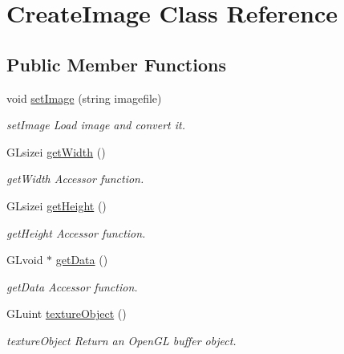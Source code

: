 \hypertarget{classCreateImage}{}\section{Create\+Image Class Reference}
\label{classCreateImage}
\subsection*{Public Member Functions}
\begin{DoxyCompactItemize}
\item 
void \hyperlink{classCreateImage_a0fb8715c56dc5ff120aa355ca66496f6}{set\+Image} (string imagefile)
\begin{DoxyCompactList}\small\item\em set\+Image Load image and convert it. \end{DoxyCompactList}\item 
G\+Lsizei \hyperlink{classCreateImage_ac0edbffce968346bd4c43564beb27c26}{get\+Width} ()
\begin{DoxyCompactList}\small\item\em get\+Width Accessor function. \end{DoxyCompactList}\item 
\mbox{\label{classCreateImage_abeb628a5f2fc67aeb1c39c1d0a445142}} 
G\+Lsizei \hyperlink{classCreateImage_abeb628a5f2fc67aeb1c39c1d0a445142}{get\+Height} ()
\begin{DoxyCompactList}\small\item\em get\+Height Accessor function. \end{DoxyCompactList}\item 
\mbox{\label{classCreateImage_a85dfaf7a1b8bf86c12877b117f8989b8}} 
G\+Lvoid $\ast$ \hyperlink{classCreateImage_a85dfaf7a1b8bf86c12877b117f8989b8}{get\+Data} ()
\begin{DoxyCompactList}\small\item\em get\+Data Accessor function. \end{DoxyCompactList}\item 
G\+Luint \hyperlink{classCreateImage_a529a1307050df8719e180e006141b762}{texture\+Object} ()
\begin{DoxyCompactList}\small\item\em texture\+Object Return an Open\+GL buffer object. \end{DoxyCompactList}\item 

\end{DoxyCompactItemize}
